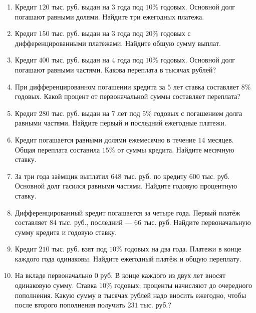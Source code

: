 \documentclass[a4paper,12pt]{article}
\begin{document}
\begin{enumerate}
\item Кредит $120$ тыс. руб. выдан на $3$ года под $10\%$ годовых. Основной долг погашают равными долями. Найдите три ежегодных платежа.
\item Кредит $150$ тыс. руб. выдан на $3$ года под $20\%$ годовых с дифференцированными платежами. Найдите общую сумму выплат.
\item Кредит $400$ тыс. руб. выдан на $4$ года под $10\%$ годовых. Основной долг погашают равными частями. Какова переплата в тысячах рублей?
\item При дифференцированном погашении кредита за $5$ лет ставка составляет $8\%$ годовых. Какой процент от первоначальной суммы составляет переплата?
\item Кредит $280$ тыс. руб. выдан на $7$ лет под $5\%$ годовых с погашением долга равными частями. Найдите первый и последний ежегодные платежи.
\item Кредит погашается равными долями ежемесячно в течение $14$ месяцев. Общая переплата составила $15\%$ от суммы кредита. Найдите месячную ставку.
\item За три года заёмщик выплатил $648$ тыс. руб. по кредиту $600$ тыс. руб. Основной долг гасился равными частями. Найдите годовую процентную ставку.
\item Дифференцированный кредит погашается за четыре года. Первый платёж составляет $84$ тыс. руб., последний --- $66$ тыс. руб. Найдите первоначальную сумму кредита и годовую ставку.
\item Кредит $210$ тыс. руб. взят под $10\%$ годовых на два года. Платежи в конце каждого года одинаковы. Найдите ежегодный платёж и общую переплату.
\item На вкладе первоначально $0$ руб. В конце каждого из двух лет вносят одинаковую сумму. Ставка $10\%$ годовых; проценты начисляют до очередного пополнения. Какую сумму в тысячах рублей надо вносить ежегодно, чтобы после второго пополнения получить $231$ тыс. руб.?
\end{enumerate}
\end{document}
